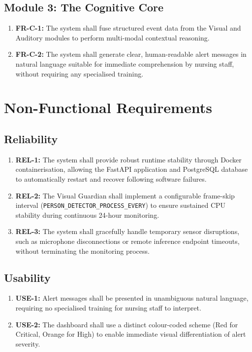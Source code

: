 \subsection{Module 3: The Cognitive Core}
\begin{enumerate}
    \item \textbf{FR-C-1:} The system shall fuse structured event data from the
    Visual and Auditory modules to perform multi-modal contextual reasoning.
    \item \textbf{FR-C-2:} The system shall generate clear, human-readable alert
    messages in natural language suitable for immediate comprehension by nursing
    staff, without requiring any specialised training.
\end{enumerate}

\section{Non-Functional Requirements}
\label{sec:nfr}

\subsection{Reliability}
\begin{enumerate}
    \item \textbf{REL-1:} The system shall provide robust runtime stability through
    Docker containerisation, allowing the FastAPI application and PostgreSQL
    database to automatically restart and recover following software failures.
    \item \textbf{REL-2:} The Visual Guardian shall implement a configurable
    frame-skip interval (\texttt{PERSON\_DETECTOR\_PROCESS\_EVERY}) to ensure
    sustained CPU stability during continuous 24-hour monitoring.
    \item \textbf{REL-3:} The system shall gracefully handle temporary sensor
    disruptions, such as microphone disconnections or remote inference endpoint
    timeouts, without terminating the monitoring process.
\end{enumerate}

\subsection{Usability}
\begin{enumerate}
    \item \textbf{USE-1:} Alert messages shall be presented in unambiguous natural
    language, requiring no specialised training for nursing staff to interpret.
    \item \textbf{USE-2:} The dashboard shall use a distinct colour-coded scheme
    (Red for Critical, Orange for High) to enable immediate visual differentiation
    of alert severity.
\end{enumerate}

